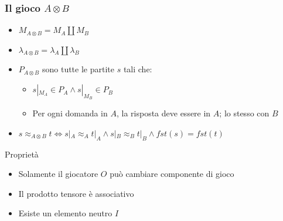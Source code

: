 \documentclass{beamer}
\begin{document}
\begin{frame}
	
	\frametitle{Il gioco $A \otimes B$}
	
	\begin{itemize}
		\item $M_{A\otimes B}=M_A \coprod M_B$
		\item $\lambda_{A\otimes B}=\lambda_A \coprod \lambda_B$
		\item $P_{A\otimes B}$ sono tutte le partite $s$ tali che:
		\begin{itemize}
			\item $s|_{M_A} \in P_A \wedge s|_{M_B} \in P_B$
			\item Per ogni domanda in $A$, la risposta deve essere in $A$; lo stesso con $B$
		\end{itemize}
		\item $s\approx_{A\otimes B} t \Leftrightarrow s|_A \approx_A t|_A \wedge s|_B \approx_B t|_B \wedge fst(s)=fst(t)$ 
	\end{itemize}
	
	\begin{block}{Proprietà}
		\begin{itemize}
			\item Solamente il giocatore $O$ può cambiare componente di gioco
			\item Il prodotto tensore è associativo
			\item Esiste un elemento neutro $I$
		\end{itemize}
		
	\end{block}
	
	
\end{frame}
\end{document}
